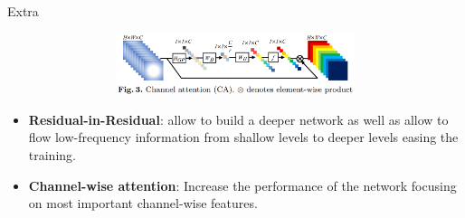 \documentclass[
    xcolor={svgnames},
    hyperref={colorlinks,citecolor=OrangeRed,linkcolor=OrangeRed,urlcolor=DarkBlue}
    ]{beamer}
\begin{document}
\begin{frame}{Extra}
{\begin{figure}
\begin{subfigure}{0.45\textwidth}
\begin{subfigure}{\textwidth}
                    \includegraphics[width=\textwidth, keepaspectratio]{rcan-channel-attention-module.png}
                \end{subfigure}                
            \end{subfigure}
        \end{figure}
        \begin{itemize}
            \item \textbf{Residual-in-Residual}: allow to build a deeper network as well as allow to flow low-frequency information from shallow levels to deeper levels easing the training. 
            \item \textbf{Channel-wise attention}: Increase the performance of the network focusing on most important channel-wise features.
        \end{itemize}
    }


\end{frame}
\end{document}
